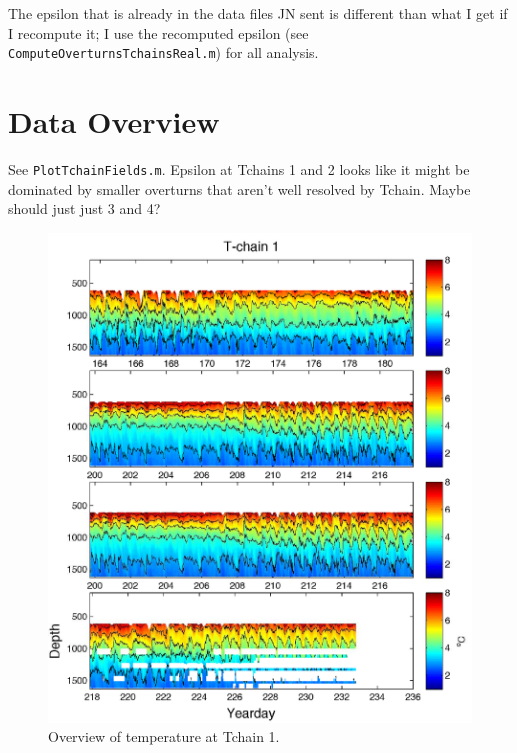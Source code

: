 \documentclass[11pt]{article}
\begin{document}
The epsilon that is already in the data files JN sent is different than what I get if I recompute it; I use the recomputed epsilon (see \verb+ComputeOverturnsTchainsReal.m+) for all analysis.



\clearpage
\section{Data Overview}

See \verb+PlotTchainFields.m+. Epsilon at Tchains 1 and 2 looks like it might be dominated by smaller overturns that aren't well resolved by Tchain. Maybe should just just 3 and 4?


\begin{figure}[htbp]
\includegraphics[scale=0.9]{Tchain1_TempOverview.pdf}
\caption{Overview of temperature at Tchain 1.}
\label{}
\end{figure}
\end{document}

